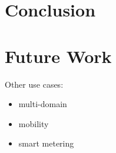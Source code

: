 \section{Conclusion} %
\label{sec:conclusion}


\section{Future Work} %
\label{sec:future_work}

Other use cases:
\begin{itemize}
	\item multi-domain
	\item mobility
	\item smart metering
\end{itemize}

